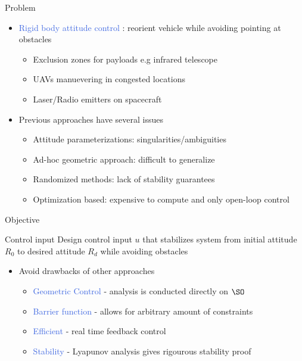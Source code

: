 \documentclass[11pt,professionalfonts]{beamer}
\def\Emph{\textcolor{RoyalBlue}}
\begin{document}
\begin{frame}[t]{Problem} %
\begin{itemize}
	\item \Emph{Rigid body attitude control} : reorient vehicle while avoiding pointing at obstacles
	\begin{itemize}
		\item Exclusion zones for payloads e.g infrared telescope
		\item UAVs manuevering in congested locations
		\item Laser/Radio emitters on spacecraft
	\end{itemize}
	\pause
	\item Previous approaches have several issues
	\begin{itemize}
		\item Attitude parameterizations: singularities/ambiguities
		\item Ad-hoc geometric approach: difficult to generalize 
		\item Randomized methods: lack of stability guarantees
		\item Optimization based: expensive to compute and only open-loop control  
	\end{itemize}
\end{itemize}
\end{frame} %

\begin{frame}{Objective} %

	\begin{block}{Control input}
		Design control input \( u \) that stabilizes system from initial attitude \( R_0 \) to desired attitude \( R_d \) while avoiding obstacles
	\end{block}
	\pause
	\begin{itemize}
		\item Avoid drawbacks of other approaches 
		\begin{itemize}
			\item \Emph{Geometric Control} - analysis is conducted directly on \( \SO \) 
			\item \Emph{Barrier function} - allows for arbitrary amount of constraints
			\item \Emph{Efficient } - real time feedback control
			\item \Emph{Stability} - Lyapunov analysis gives rigourous stability proof
		\end{itemize}
	\end{itemize}
\end{frame}
\end{document}
